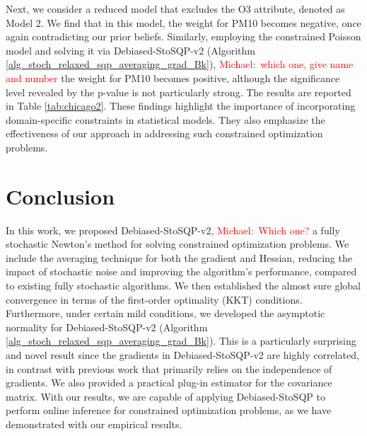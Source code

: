 \documentclass[aos]{imsart}
\numberwithin{equation}{section}
\theoremstyle{plain}
\newcommand{\michael}[1]{\textcolor{red}{Michael:\ #1}}
\begin{document}
Next, we consider a reduced model that excludes the O3 attribute, denoted as Model 2. We find that in this model, the weight for PM10 becomes negative, once again contradicting our prior beliefs.
Similarly, employing the constrained Poisson model and solving it via Debiased-StoSQP-v2 (Algorithm \ref{alg_stoch_relaxed_sqp_averaging_grad_Bk}), 
\michael{which one, give name and number} 
the weight for PM10 becomes positive, although the significance level revealed by the p-value is not particularly strong. The results are reported in Table \ref{tab:chicago2}. 
These findings highlight the importance of incorporating domain-specific constraints in statistical models. They also emphasize the effectiveness of our approach in addressing such constrained optimization problems.


\section{Conclusion}
In this work, we proposed Debiased-StoSQP-v2, 
\michael{Which one?}
a fully stochastic Newton's method for solving constrained optimization problems.
We include the averaging technique for both the gradient and Hessian, reducing the impact of stochastic noise and improving the algorithm's performance, compared to existing fully stochastic algorithms. 
We then established the almost sure global convergence in terms of the first-order optimality (KKT) conditions. 
Furthermore, under certain mild conditions, we developed the asymptotic normality for Debiased-StoSQP-v2 (Algorithm \ref{alg_stoch_relaxed_sqp_averaging_grad_Bk}).
This is a particularly surprising and novel result since the gradients in Debiased-StoSQP-v2 are highly correlated, in contrast with previous work that primarily relies on the independence of gradients. 
We also provided a practical plug-in estimator for the covariance matrix. 
With our results, we are capable of applying Debiased-StoSQP to perform online inference for constrained optimization problems, as we have demonstrated with our empirical results. 
\end{document}
